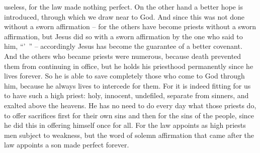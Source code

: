 {useless,
for
the law
made
nothing
perfect.
On the other hand
a better
hope
is introduced,
through
which
we draw near
to God.
And
since
this was not
done without
a sworn affirmation
– for
the others
have become
priests
without
a sworn affirmation,
but
Jesus did so with
a sworn affirmation
by
the one who said
to
him, “{}’ ” –
accordingly
Jesus
has become
the guarantee
of a better
covenant.
And
the others
who became
priests
were
numerous,
because
death
prevented
them from continuing in office,
but
he holds
his priesthood
permanently
since
he
lives
forever.
So
he is able
to save
completely
those who come
to God
through
him,
because he always
lives
to
intercede
for
them.
For
it is indeed fitting
for us
to have such
a high priest: holy,
innocent,
undefiled,
separate
from
sinners,
and
exalted
above
the heavens.
He has
no
need
to do every
day
what those priests
do, to offer
sacrifices
first
for
their own
sins
and then
for the sins of the people,
since
he did
this
in offering
himself
once for all.
For
the law
appoints
as high priests
men
subject
to weakness,
but
the word
of solemn affirmation
that came after
the law
appoints a son
made perfect
forever.

}
